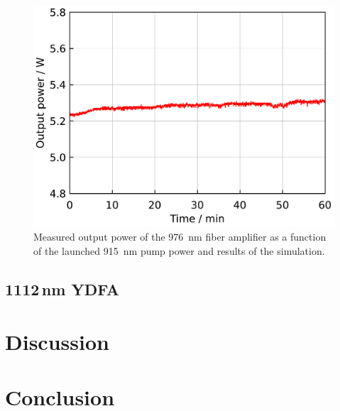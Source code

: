 \documentclass{osa-article}
\begin{document}
\begin{figure}[h!]
  \centering
  \begin{minipage}[b]{0.5\linewidth}
    \centering
    \includegraphics[keepaspectratio, width=0.9\linewidth]{./Figure/DCF-YB-20-128P-FAC172mm_SignalLongTermStability_915Pump70W976Seed0.24W_Exp}
  \end{minipage}
  \caption{Measured output power of the \SI{976}{nm} fiber amplifier as a function of the launched \SI{915}{nm} pump power and results of the simulation.}
  \label{fig:LongTermStabilityOfCORACTIVE976YDFA}
\end{figure}


\subsection{1112\,nm YDFA}


\section{Discussion}

\section{Conclusion}

\end{document}
